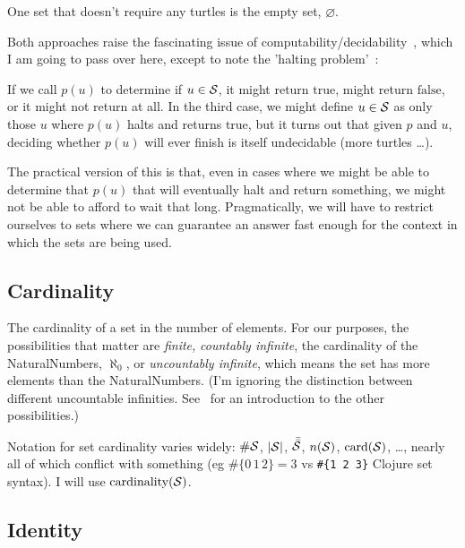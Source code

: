One set that doesn't require any turtles is 
the empty set, $\varnothing$.


Both approaches raise the fascinating issue of 
computability/decidability~\cite{church1936unsolvable,
turing1936computability,
turing1938computable-correction,
turing1937computability-lambda},
which I am going to pass over here, except to note the 
'halting problem'~\cite{wiki:Halting-problem}:

If we call $p(u)$ to determine if $u \in \mathcal{S}$, 
it might return $\text{true}$, might return $\text{false}$,
or it might not return at all.
In the third case, we might define $u \in \mathcal{S}$ as only those
$u$ where $p(u)$ halts and returns $\text{true}$, but it turns 
out that given $p$ and $u$, deciding whether $p(u)$ will ever
finish is itself undecidable (more turtles \ldots).

The practical version of this is that, even in cases where we
might be able to determine that $p(u)$ that will eventually halt
and return something, we might not be able to afford to wait that
long.
Pragmatically, we will have to restrict ourselves to sets where we
can guarantee an answer fast enough for the context in which the
sets are being used.

\subsection{Cardinality}

The cardinality of a set in the number of elements.
For our purposes, the possibilities that matter are \emph{finite,}
\emph{countably infinite}, the cardinality of the
\gls{NaturalNumbers}, $\aleph_{0}$, or \emph{uncountably
infinite}, which means the set has more elements than the
\gls{NaturalNumbers}.
(I'm ignoring the distinction between different uncountable
infinities.
See~\cite{wiki:cardinal-number} for an introduction to the other
possibilities.)

Notation for set cardinality varies widely:
$\#\mathcal{S}$,  $|\mathcal{S}|$,
$\bar{\bar{\mathcal{S}}}$, $n(\mathcal{S})$,
$\text{card}(\mathcal{S})$, \ldots, nearly all of which conflict
with something (eg $\#\{ 0 \, 1 \, 2 \} = 3$ vs 
\lstinline|#{1 2 3}| Clojure set syntax).
I will use $\text{cardinality}(\mathcal{S})$.

 
\subsection{Identity}

